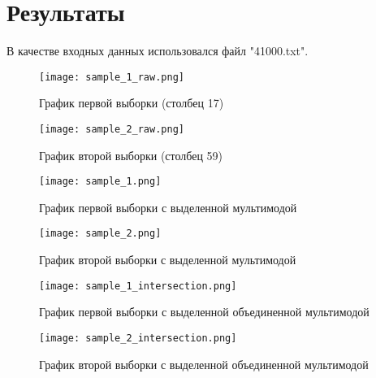 \documentclass[12pt,a4paper]{article}
\begin{document}
	\section{Результаты}
            В качестве входных данных использовался файл "41000.txt".
                \begin{figure}[h!]
                    \centering
                    \texttt{[image: sample\_1\_raw.png]}
                    \caption{График первой выборки (столбец 17)}
                \end{figure}
                \FloatBarrier
                
                \begin{figure}[h!]
                    \centering
                    \texttt{[image: sample\_2\_raw.png]}
                    \caption{График второй выборки (столбец 59)}
                \end{figure}
                \FloatBarrier
                
                \begin{figure}[h!]
                    \centering
                    \texttt{[image: sample\_1.png]}
                    \caption{График первой выборки с выделенной мультимодой}
                \end{figure}
                \FloatBarrier
                
                \begin{figure}[h!]
                    \centering
                    \texttt{[image: sample\_2.png]}
                    \caption{График второй выборки с выделенной мультимодой}
                \end{figure}
                \FloatBarrier

            
                \begin{figure}[h!]
                    \centering
                    \texttt{[image: sample\_1\_intersection.png]}
                    \caption{График первой выборки с выделенной объединенной мультимодой}
                \end{figure}
                \FloatBarrier
    
                \begin{figure}[h!]
                    \centering
                    \texttt{[image: sample\_2\_intersection.png]}
                    \caption{График второй выборки с выделенной объединенной мультимодой}
                \end{figure}
                \FloatBarrier
        \clearpage
	\newpage
\end{document}
